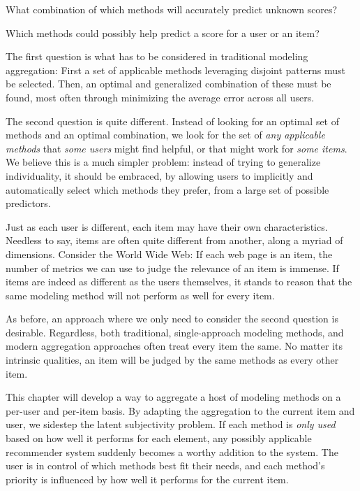 \begin{enumerate*}
  \item What combination of which methods will accurately predict unknown scores?
  \item Which methods could possibly help predict a score for a user or an item?
\end{enumerate*}

The first question is what has to be considered in traditional modeling aggregation:
First a set of applicable methods leveraging disjoint patterns must be selected. 
Then, an optimal and generalized combination of these must be found,
most often through minimizing the average error across all users.

The second question is quite different. 
Instead of looking for an optimal set of methods and an optimal combination,
we look for the set of \emph{any applicable methods} that \emph{some users} might find helpful,
or that might work for \emph{some items}.
We believe this is a much simpler problem: 
instead of trying to generalize individuality,
it should be embraced, by allowing users to implicitly and automatically select which methods they prefer,
from a large set of possible predictors.

Just as each user is different, each item may have their own characteristics.
Needless to say, items are often quite different from another,
along a myriad of dimensions. Consider the World Wide Web:
If each web page is an item, the number of metrics we can use to judge
the relevance of an item is immense.
If items are indeed as different as the users themselves, it stands to reason that the same 
modeling method will not perform as well for every item.

As before, an approach where we only need to consider the second question is desirable.
Regardless, both traditional, single-approach modeling methods, and modern aggregation approaches
often treat every item the same. No matter its intrinsic qualities, an item will be judged
by the same methods as every other item. 

This chapter will develop a way to aggregate a host of modeling methods on a per-user and per-item basis.
By adapting the aggregation to the current item and user, we sidestep the latent subjectivity problem. 
If each method is \emph{only used} based on how well it performs for each element,
any possibly applicable recommender system suddenly becomes a worthy addition to the system.
The user is in control of which methods best fit their needs, and
each method's priority is influenced by how well it performs for the current item.

\clearpage
